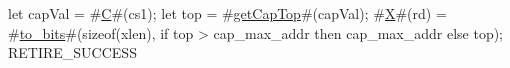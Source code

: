 let capVal = #\hyperref[sailRISCVzC]{C}#(cs1);
let top = #\hyperref[sailRISCVzgetCapTop]{getCapTop}#(capVal);
#\hyperref[sailRISCVzX]{X}#(rd) = #\hyperref[sailRISCVztozybits]{to\_bits}#(sizeof(xlen), if top > cap_max_addr then cap_max_addr else top);
RETIRE_SUCCESS
